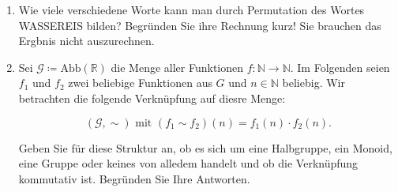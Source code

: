 \begin{enumerate}
{{      2. Andere Darstellung
      \begin{equation*}
        \begin{aligned}
          1 &= 1 \cdot 5 - 2 \cdot 2 = 1 \cdot 5 - 2 \cdot (1 \cdot 7 - 1 \cdot 5) && \\
            &= -2 \cdot 7 + 3 \cdot 5 = -2 \cdot 7 + 3 \cdot (1 \cdot 12 - 1 \cdot 7) && \\
            &= 3 \cdot 12 - 5 \cdot 7 &&
        \end{aligned}
      \end{equation*}

      3. Chinesischer Restsatz

      $x = 3 \cdot 12 \cdot 4 + (-5) \cdot 7 \cdot 3 = 3 \cdot (12 \cdot 4 + (-5) \cdot 7) = 3 \cdot (48 - 35) = 3 \cdot 13 = 39 < 84$
    }{}
  }
  \vfill
  \item {
    Wie viele verschiedene Worte kann man durch Permutation des Wortes WASSEREIS
    bilden?
    Begründen Sie ihre Rechnung kurz!
    Sie brauchen das Ergbnis nicht auszurechnen.

  }
  \vfill
  \newpage
  \item {
    Sei $\mathcal{G} \coloneq \text{Abb}(\mathbb{R})$ die Menge aller Funktionen
    $f: \mathbb{N} \to \mathbb{N}$.
    Im Folgenden seien $f_1$ und $f_2$ zwei beliebige Funktionen aus $G$ und
    $n \in \mathbb{N}$ beliebig.
    Wir betrachten die folgende Verknüpfung auf diesre Menge:

    \[
      (\mathcal{G}, \sim) \text{~mit~} (f_1 \sim f_2)(n) = f_1(n) \cdot f_2(n).
    \]

    Geben Sie für diese Struktur an, ob es sich um eine Halbgruppe, ein Monoid,
    eine Gruppe oder keines von alledem handelt und ob die Verknüpfung kommutativ
    ist.
    Begründen Sie Ihre Antworten.

}
\end{enumerate}
